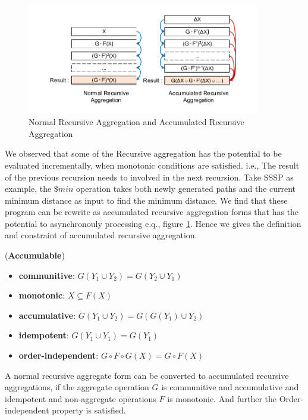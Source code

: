 {
	\begin{figure}[t]
		\vspace{-0.1in}
		\centerline{\includegraphics[width=4in]{fig/accumulative.pdf}}
		\caption{Normal Recursive Aggregation and Accumulated Recursive Aggregation }
		\vspace{-0.1in}
		\label{fig:arasssp}
	\end{figure}

We observed that some of the Recursive aggregation has the potential to be evaluated incrementally, when monotonic conditions are satisfied. i.e., The result of the previous recursion needs to involved in the next recursion. Take SSSP as example, the $\$min$ operation takes both newly generated paths and the current minimum distance as input to find the minimum distance. We find that these program can be rewrite as accumulated recursive aggregation forms that has the potential to asynchronouly processing e.q., figure \ref{fig:arasssp}. Hence we gives the definition and constraint of accumulated recursive aggregation.


\begin{definition}
	\label{th:monotone}
	(\textbf{Accumulable}) 
	\begin{itemize}
		\item \textbf{communitive}: $G(Y_1\cup Y_2)=G(Y_2\cup Y_1)$
		\item \textbf{monotonic}: $X\subseteq F(X)$
		\item \textbf{accumulative}: $G(Y_1\cup Y_2)=G(G(Y_1)\cup Y_2)$
		\item \textbf{idempotent}: $G(Y_1\cup Y_1)=G(Y_1)$
		\item \textbf{order-independent}: $G\circ F\circ G(X)=G\circ F(X)$
	\end{itemize}
	A normal recursive aggregate form can be converted to accumulated recursive aggregations, if the aggregate operation $G$ is communitive and accumulative and idempotent and non-aggregate operations $F$ is monotonic. And further the Order-independent property is satisfied.
\end{definition}
	
}
